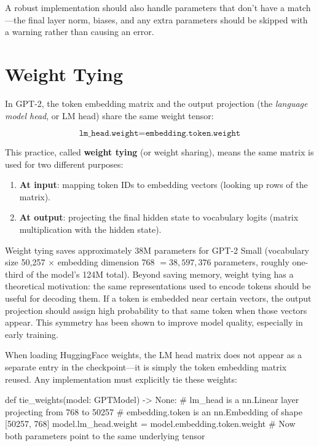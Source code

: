 A robust implementation should also handle parameters that don't have a
match---the final layer norm, biases, and any extra parameters should be
skipped with a warning rather than causing an error.

\section{Weight Tying}

In GPT-2, the token embedding matrix and the output projection (the
\emph{language model head}, or LM head) share the same weight tensor:

\[
  \texttt{lm\_head.weight} = \texttt{embedding.token.weight}
\]

This practice, called \textbf{weight tying} (or weight sharing), means the
same matrix is used for two different purposes:

\begin{enumerate}
  \item \textbf{At input}: mapping token IDs to embedding vectors (looking
        up rows of the matrix).
  \item \textbf{At output}: projecting the final hidden state to vocabulary
        logits (matrix multiplication with the hidden state).
\end{enumerate}

\begin{keyconcept}
  Weight tying saves approximately 38M parameters for GPT-2 Small
  (vocabulary size 50,257 $\times$ embedding dimension 768 $= 38,597,376$
  parameters, roughly one-third of the model's 124M total). Beyond saving
  memory, weight tying has a theoretical motivation: the same
  representations used to encode tokens should be useful for decoding them.
  If a token is embedded near certain vectors, the output projection should
  assign high probability to that same token when those vectors appear.
  This symmetry has been shown to improve model quality, especially in
  early training.
\end{keyconcept}

When loading HuggingFace weights, the LM head matrix does not appear as a
separate entry in the checkpoint---it is simply the token embedding matrix
reused. Any implementation must explicitly tie these weights:

\begin{pseudocode}
def tie_weights(model: GPTModel) -> None:
    # lm_head is a nn.Linear layer projecting from 768 to 50257
    # embedding.token is an nn.Embedding of shape [50257, 768]
    model.lm_head.weight = model.embedding.token.weight
    # Now both parameters point to the same underlying tensor
\end{pseudocode}

